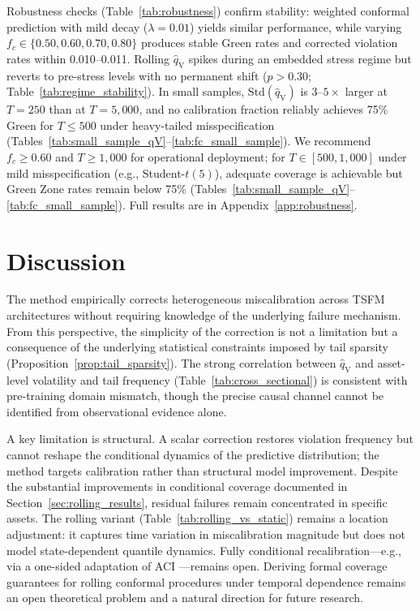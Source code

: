 \documentclass[preprint,11pt,authoryear]{elsarticle}
\newcommand{\1}{\boldsymbol{1}}
\newcommand{\qV}{\hat{q}_{\scriptscriptstyle\mathrm{V}}}
\begin{document}
	Robustness checks (Table~\ref{tab:robustness}) confirm
	stability: weighted conformal prediction with mild decay
	($\lambda = 0.01$) yields similar performance, while varying
	$f_c \in \{0.50, 0.60, 0.70, 0.80\}$ produces stable Green
	rates and corrected violation rates within 0.010--0.011.
	Rolling $\qV$ spikes during an embedded stress regime but
	reverts to pre-stress levels with no permanent shift
	($p > 0.30$; Table~\ref{tab:regime_stability}). In small
	samples, $\text{Std}(\qV)$ is $3$--$5\times$ larger at
	$T = 250$ than at $T = 5{,}000$, and no calibration fraction
	reliably achieves 75\% Green for $T \leq 500$ under
	heavy-tailed misspecification
	(Tables~\ref{tab:small_sample_qV}--\ref{tab:fc_small_sample}).
	We recommend $f_c \geq 0.60$ and $T \geq 1{,}000$ for operational
	deployment; for $T \in [500, 1{,}000]$ under mild misspecification
	(e.g., Student-$t(5)$), adequate coverage is achievable but Green
	Zone rates remain below 75\%
	(Tables~\ref{tab:small_sample_qV}--\ref{tab:fc_small_sample}).
	Full results are in Appendix~\ref{app:robustness}.
	
	
	\section{Discussion}
	\label{sec:discuss}

	The method empirically corrects heterogeneous miscalibration
	across TSFM architectures without requiring knowledge of the
	underlying failure mechanism. From this perspective, the simplicity of the correction is not a limitation but a consequence of the underlying statistical constraints imposed by tail sparsity (Proposition~\ref{prop:tail_sparsity}). The strong correlation between
	$\qV$ and asset-level volatility and tail frequency
	(Table~\ref{tab:cross_sectional}) is consistent with
	pre-training domain mismatch, though the precise causal
	channel cannot be identified from observational evidence alone.
	
	A key limitation is structural. A scalar correction restores
	violation frequency but cannot reshape the conditional
	dynamics of the predictive distribution; the method targets calibration rather than structural model improvement. Despite the substantial improvements in conditional coverage documented in Section~\ref{sec:rolling_results}, residual failures remain concentrated in specific assets. The rolling variant
	(Table~\ref{tab:rolling_vs_static}) remains a location
	adjustment: it captures time variation in miscalibration magnitude but does not model state-dependent quantile dynamics. Fully conditional recalibration---e.g., via a
	one-sided adaptation of ACI \citep{gibbs2021adaptive}---remains
	open.
	Deriving formal coverage guarantees for rolling conformal procedures under temporal dependence remains an open theoretical problem and a natural direction for future research.
\end{document}
